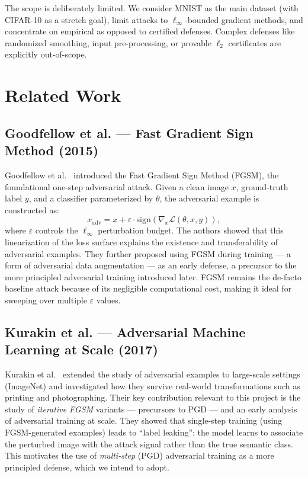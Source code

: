 \documentclass[conference,10pt]{IEEEtran}
\begin{document}
The scope is deliberately limited. We consider MNIST as the main dataset (with CIFAR-10 as a stretch goal), limit attacks to $\ell_\infty$-bounded gradient methods, and concentrate on empirical as opposed to certified defenses.
Complex defenses like randomized smoothing, input pre-processing, or provable $\ell_2$ certificates are explicitly out-of-scope.


\section{Related Work}

\subsection{Goodfellow et al. — Fast Gradient Sign Method (2015)}

Goodfellow et al.~\cite{goodfellow2015fgsm} introduced the Fast Gradient
Sign Method (FGSM), the foundational one-step adversarial attack. Given a
clean image $x$, ground-truth label $y$, and a classifier parameterized by
$\theta$, the adversarial example is constructed as:
\begin{equation}
    x_{\mathrm{adv}} = x + \varepsilon \cdot
    \mathrm{sign}\!\left(\nabla_x \mathcal{L}(\theta, x, y)\right),
    \label{eq:fgsm}
\end{equation}
where $\varepsilon$ controls the $\ell_\infty$ perturbation budget. The
authors showed that this linearization of the loss surface explains the
existence and transferability of adversarial examples.
They further proposed using FGSM during training — a form of adversarial
data augmentation — as an early defense, a precursor to the more principled
adversarial training introduced later. FGSM remains the de-facto baseline
attack because of its negligible computational cost, making it ideal for
sweeping over multiple $\varepsilon$ values.
\subsection{Kurakin et al. — Adversarial Machine Learning at Scale (2017)}

Kurakin et al.~\cite{kurakin2017scale} extended the study of adversarial
examples to large-scale settings (ImageNet) and investigated how they
survive real-world transformations such as printing and photographing.
Their key contribution relevant to this project is the study of
\emph{iterative FGSM} variants — precursors to PGD — and an early analysis
of adversarial training at scale. They showed that single-step training
(using FGSM-generated examples) leads to ``label leaking'': the model
learns to associate the perturbed image with the attack signal rather than
the true semantic class. This motivates the use of \emph{multi-step} (PGD)
adversarial training as a more principled defense, which we intend to adopt.
\end{document}
